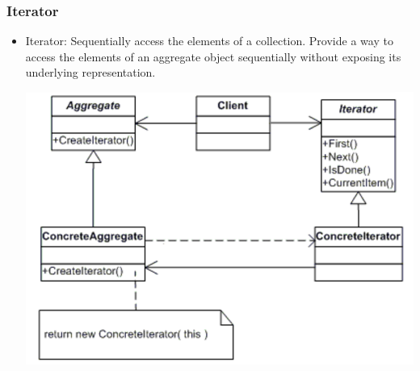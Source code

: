 \documentclass[a4paper,12pt,twoside]{book}
\begin{document}
\subsubsection{Iterator}
\begin{itemize}
\item Iterator: Sequentially access the elements of a collection. Provide a way to access the elements of an aggregate object sequentially without exposing its underlying representation.

\includegraphics[scale=0.8]{pics/iterator.png}


\end{itemize}
\end{document}
